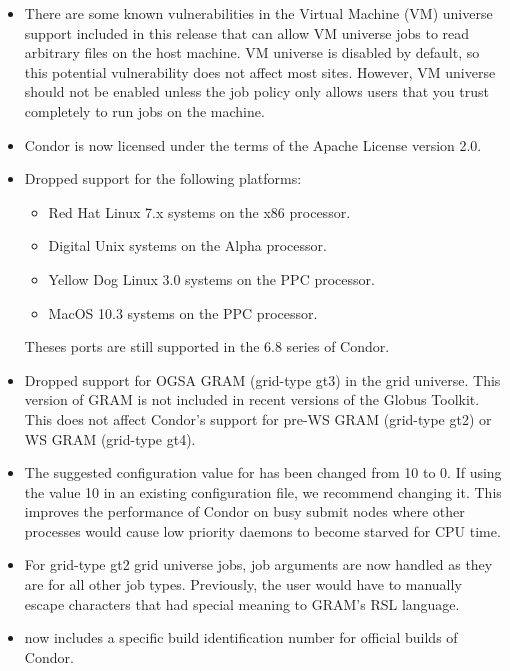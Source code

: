 \begin{itemize}

\item There are some known vulnerabilities in the Virtual Machine
  (VM) universe support included in this release that can allow VM
  universe jobs to read arbitrary files on the host machine.
  VM universe is disabled by default, so this potential vulnerability
  does not affect most sites.
  However, VM universe should not be enabled unless the job policy
  only allows users that you trust completely to run jobs on the
  machine.

\item Condor is now licensed under the terms of the Apache License
  version 2.0.

\item Dropped support for the following platforms:
\begin{itemize}
\item Red Hat Linux 7.x systems on the x86 processor.
\item Digital Unix systems on the Alpha processor.
\item Yellow Dog Linux 3.0 systems on the PPC processor.
\item MacOS 10.3 systems on the PPC processor.
\end{itemize}
Theses ports are still supported in the 6.8 series of Condor.

\item Dropped support for OGSA GRAM (grid-type gt3) in the grid
universe. This version of GRAM is not included in recent versions of
the Globus Toolkit. This does not affect Condor's support for pre-WS
GRAM (grid-type gt2) or WS GRAM (grid-type gt4).

\item The suggested configuration value for
 has been changed from 10 to 0.  If
using the value 10 in an existing configuration file, we recommend
changing it.  This improves the performance of Condor on busy submit nodes
where other processes would cause low priority  daemons
to become starved for CPU time.

\item For grid-type gt2 grid universe jobs, job arguments are now handled
as they are for all other job types. Previously, the user would have to
manually escape characters that had special meaning to GRAM's RSL
language.

\item {} now includes a specific build
identification number for official builds of Condor.

\end{itemize}


